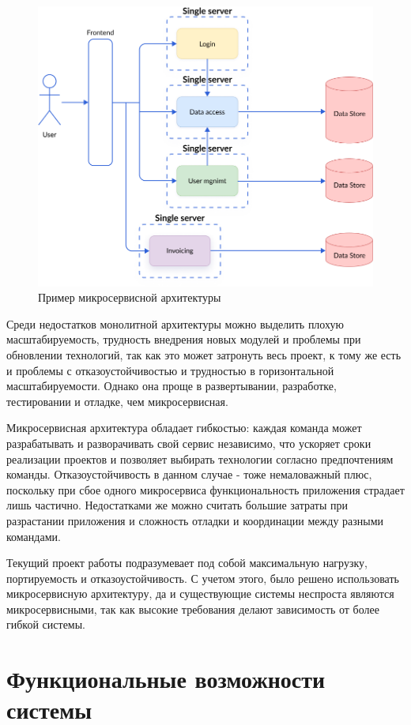 \begin{figure}
  \centering
  \includegraphics[width=.9\textwidth]{graphics/img/micro.png}
  \caption{Пример микросервисной архитектуры}
  \label{fig:micro}
\end{figure}

Среди недостатков монолитной архитектуры можно выделить плохую масштабируемость, трудность внедрения новых модулей и проблемы при обновлении технологий, так как это может затронуть весь проект, к тому же есть и проблемы с отказоустойчивостью и трудностью в горизонтальной масштабируемости. Однако она проще в развертывании, разработке, тестировании и отладке, чем микросервисная. \cite{arch:monovsmicro}

Микросервисная архитектура обладает гибкостью: каждая команда может разрабатывать и разворачивать свой сервис независимо, что ускоряет сроки реализации проектов и позволяет выбирать технологии согласно предпочтениям команды. Отказоустойчивость в данном случае - тоже немаловажный плюс, поскольку при сбое одного микросервиса функциональность приложения страдает лишь частично. Недостатками же можно считать большие затраты при разрастании приложения и сложность отладки и координации между разными командами.

Текущий проект работы подразумевает под собой максимальную нагрузку, портируемость и отказоустойчивость. С учетом этого, было решено использовать микросервисную архитектуру, да и существующие системы неспроста являются микросервисными, так как высокие требования делают зависимость от более гибкой системы.

\section{Функциональные возможности системы}


